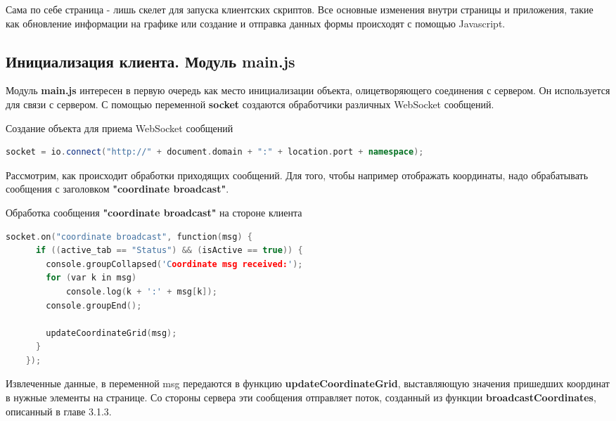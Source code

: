Сама по себе страница - лишь скелет для запуска клиентских скриптов. Все основные изменения внутри страницы и приложения, такие как обновление информации на графике или создание и отправка данных формы происходят с помощью Javascript.

\subsection{Инициализация клиента. Модуль main.js} \label{subsect3_2_2}

Модуль \textbf{main.js} интересен в первую очередь как место инициализации объекта, олицетворяющего соединения с сервером. Он используется для связи с сервером. С помощью переменной \textbf{socket} создаются обработчики различных WebSocket сообщений.

\begin{ListingEnv}[H]
  \caption{Создание объекта для приема WebSocket сообщений}
  \label{list:hwbeauty}
  \begin{lstlisting}[language=C++]
    socket = io.connect("http://" + document.domain + ":" + location.port + namespace);
  \end{lstlisting}
\end{ListingEnv}

Рассмотрим, как происходит обработки приходящих сообщений. Для того, чтобы например отображать координаты, надо обрабатывать сообщения с заголовком \textbf{"coordinate broadcast"}.

\begin{ListingEnv}[H]
  \caption{Обработка сообщения \textbf{"coordinate broadcast"} на стороне клиента}
  \label{list:hwbeauty}
  \begin{lstlisting}[language=C++]
    socket.on("coordinate broadcast", function(msg) {
      if ((active_tab == "Status") && (isActive == true)) {
        console.groupCollapsed('Coordinate msg received:');
        for (var k in msg)
            console.log(k + ':' + msg[k]);
        console.groupEnd();

        updateCoordinateGrid(msg);
      }
    });
  \end{lstlisting}
\end{ListingEnv}

Извлеченные данные, в переменной msg передаются в функцию \textbf{updateCoordinateGrid}, выставляющую значения пришедших координат в нужные элементы на странице. Со стороны сервера эти сообщения отправляет поток, созданный из функции \textbf{broadcastCoordinates}, описанный в главе 3.1.3.

